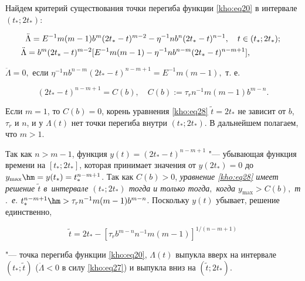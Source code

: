 Найдем критерий существования точки перегиба функции \eqref{kho:eq20} в интервале $(t_\ast;2t_\ast)$:

\begin{multline}

\label{kho:eq27}

\ddot{\Lambda}=E^{-1}m(m-1)b^m(2t_\ast-t)^{m-2}-\eta^{-1}nb^n(2t_\ast-t)^{n-1}, \quad t\in(t_\ast;2t_\ast);

\\

\ddot{\Lambda}=b^m(2t_\ast-t)^{m-2}[E^{-1}m(m-1)-\eta^{-1}nb^{n-m}(2t_\ast-t)^{n-m+1}],\hspace{1.5cm}

\end{multline}

$

\ddot{\Lambda}=0, \text{ если } \eta^{-1}nb^{n-m}(2t_\ast-t)^{n-m+1}=E^{-1}m(m-1), \text{ т.~е.}

$

\begin{equation}

(2t_\ast-t)^{n-m+1}=C(b), \quad C(b):=\tau_rn^{-1}m(m-1)b^{m-n}.

\label{kho:eq28}

\end{equation}



Если $m=1$, то $C(b)=0$, корень уравнения \eqref{kho:eq28} $\tilde{t}=2t_\ast$ не зависит от $b$, $\tau_r$ и $n$, и у $\Lambda(t)$ нет точки перегиба внутри $(t_\ast;2t_\ast)$. В дальнейшем полагаем, что $m>1$. 



Так как $n>m-1$, функция $y(t)=(2t_\ast-t)^{n-m+1}$ "--- убывающая функция времени на $[t_\ast;2t_\ast]$, которая принимает значения от $y(2t_\ast)=0$ до $y_{\max}\hm =y(t_\ast)=t_\ast^{n-m+1}$. Так как $C(b)>0$,  \textit{уравнение \eqref{kho:eq28} имеет решение $\tilde{t}$ в~интервале $(t_\ast;2t_\ast)$ тогда и только тогда$,$ когда $y_{\max}>C(b),$ т$.$~е$.$ $t_\ast^{n-m+1}\hm >\tau_rn^{-1}m(m-1)b^{m-n}$}. Поскольку $y(t)$ убывает, решение единственно, 

\begin{equation}

\label{kho:eq29}

\tilde{t}=2t_\ast-[\tau_rb^{m-n}n^{-1}m(m-1)]^{1/(n-m+1)}

\end{equation}

"--- точка перегиба функции \eqref{kho:eq20}, $\Lambda(t)$ выпукла вверх на интервале $(t_\ast;\tilde{t})$ ($\ddot{\Lambda}<0$ в силу \eqref{kho:eq27}) и выпукла вниз на $(\tilde{t};2t_\ast)$. 



